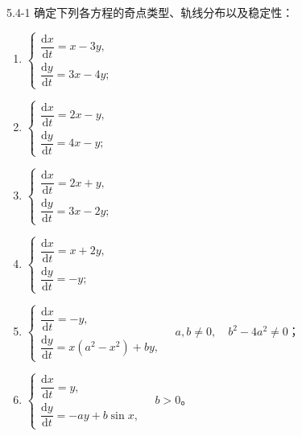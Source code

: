 \documentclass[UTF8,a4paper,11pt]{ctexart}
\begin{document}
\begin{problem}{5.4-1}
确定下列各方程的奇点类型、轨线分布以及稳定性：
\begin{enumerate}[label=(\arabic*)]
\item $\begin{cases}\dfrac{\mathrm dx}{\mathrm dt}=x-3y,\\[3pt]\dfrac{\mathrm dy}{\mathrm dt}=3x-4y;\end{cases}$
\item $\begin{cases}\dfrac{\mathrm dx}{\mathrm dt}=2x-y,\\[3pt]\dfrac{\mathrm dy}{\mathrm dt}=4x-y;\end{cases}$
\item $\begin{cases}\dfrac{\mathrm dx}{\mathrm dt}=2x+y,\\[3pt]\dfrac{\mathrm dy}{\mathrm dt}=3x-2y;\end{cases}$
\item $\begin{cases}\dfrac{\mathrm dx}{\mathrm dt}=x+2y,\\[3pt]\dfrac{\mathrm dy}{\mathrm dt}=-y;\end{cases}$
\item $\begin{cases}\dfrac{\mathrm dx}{\mathrm dt}=-y,\\[3pt]\dfrac{\mathrm dy}{\mathrm dt}=x(a^2-x^2)+by,\end{cases}
\quad a,b\ne0,\quad b^2-4a^2\ne0$；
\item $\begin{cases}\dfrac{\mathrm dx}{\mathrm dt}=y,\\[3pt]\dfrac{\mathrm dy}{\mathrm dt}=-ay+b\sin x,\end{cases}
\quad b>0$。
\end{enumerate}
\end{problem}
\end{document}
